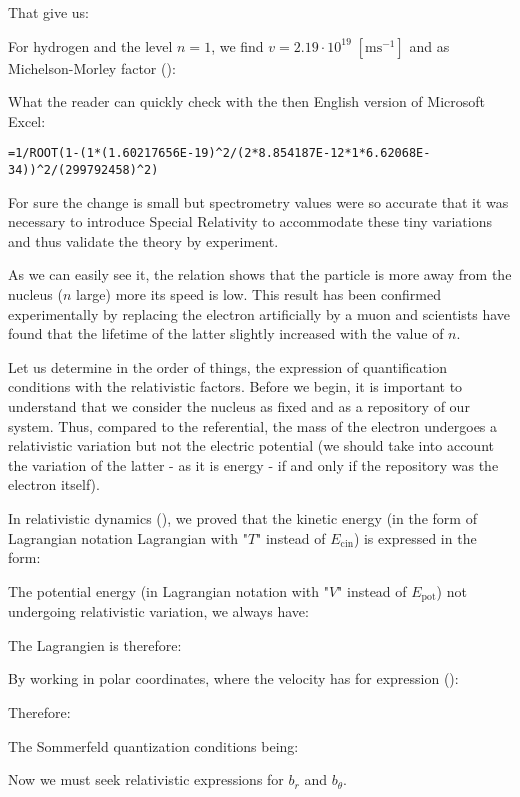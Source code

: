 	That give us:
	
	For hydrogen and the level $n=1$, we find $v=2.19\cdot 10^{19}\; [\text{m}\text{s}^{-1}]$ and as Michelson-Morley factor ():
	
	What the reader can quickly check with the then English version of Microsoft Excel:
	
	\texttt{=1/ROOT(1-(1*(1.60217656E-19)\string^2/(2*8.854187E-12*1*6.62068E-34))\string^2/(299792458)\string^2)}
	
	For sure the change is small but spectrometry values were so accurate that it was necessary to introduce Special Relativity to accommodate these tiny variations and thus validate the theory by experiment.
	\begin{tcolorbox}[title=Remark,colframe=black,arc=10pt]
	As we can easily see it, the relation shows that the particle is more away from the nucleus ($n$ large) more its speed is low. This result has been confirmed experimentally by replacing the electron artificially by a muon and scientists have found that the lifetime of the latter slightly increased with the value of $n$.
	\end{tcolorbox}
	Let us determine in the order of things, the expression of quantification conditions with the relativistic factors. Before we begin, it is important to understand that we consider the nucleus as fixed and as a repository of our system. Thus, compared to the referential, the mass of the electron undergoes a relativistic variation but not the electric potential (we should take into account the variation of the latter - as it is energy - if and only if the repository was the electron itself).
	
	In relativistic dynamics (), we proved that the kinetic energy (in the form of Lagrangian notation Lagrangian with "$T$" instead of $E_{\text{cin}}$) is expressed in the form:
	
	The potential energy (in Lagrangian notation with "$V$" instead of $E_{\text{pot}}$) not undergoing relativistic variation, we always have:
	
	The Lagrangien is therefore:
	
	By working in polar coordinates, where the velocity has for expression ():
	
	Therefore:
	
	The Sommerfeld quantization conditions being:
	
	Now we must seek relativistic expressions for $b_r$ and $b_\theta$.
	
